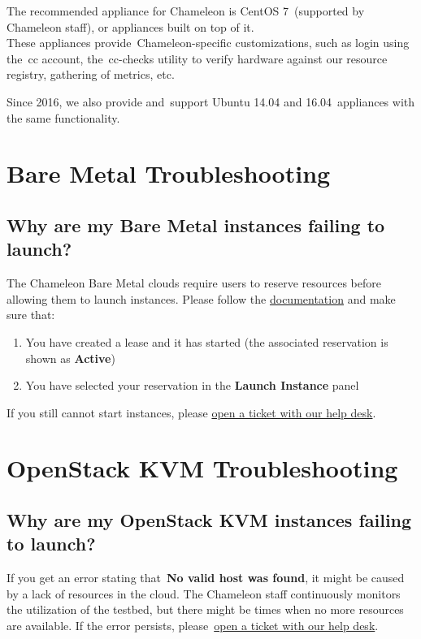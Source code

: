 The recommended appliance for Chameleon is CentOS 7~(supported by
Chameleon staff), or appliances built on top of it.\\
These appliances provide~Chameleon-specific customizations, such as
login using the~cc account, the~cc-checks utility to verify hardware
against our resource registry, gathering of metrics, etc.

Since 2016, we also provide and~support Ubuntu 14.04 and
16.04~appliances with the same functionality.

\section{Bare Metal Troubleshooting}\label{bare-metal-troubleshooting}

\subsection{Why are my Bare Metal instances failing to
launch?}\label{why-are-my-bare-metal-instances-failing-to-launch}

The Chameleon Bare Metal clouds require users to reserve resources
before allowing them to launch instances. Please follow the
\href{https://www.chameleoncloud.org/docs/bare-metal/}{documentation}
and make sure that:

\begin{enumerate}
\item
  You have created a lease and it has started (the associated
  reservation is shown as \textbf{Active})
\item
  You have selected your reservation in the \textbf{Launch Instance}
  panel
\end{enumerate}

If you still cannot start instances, please
\href{https://www.chameleoncloud.org/user/help/}{open a ticket with our
help desk}.

\section{OpenStack KVM Troubleshooting}\label{openstack-kvm-troubleshooting}

\subsection{Why are my OpenStack KVM instances failing to
launch?}\label{why-are-my-openstack-kvm-instances-failing-to-launch}

If you get an error stating that~\textbf{No valid host was found}, it
might be caused by a lack of resources in the cloud. The Chameleon staff
continuously monitors the utilization of the testbed, but there might be
times when no more resources are available. If the error persists,
please~\href{https://www.chameleoncloud.org/user/help/}{open a ticket
with our help desk}.

